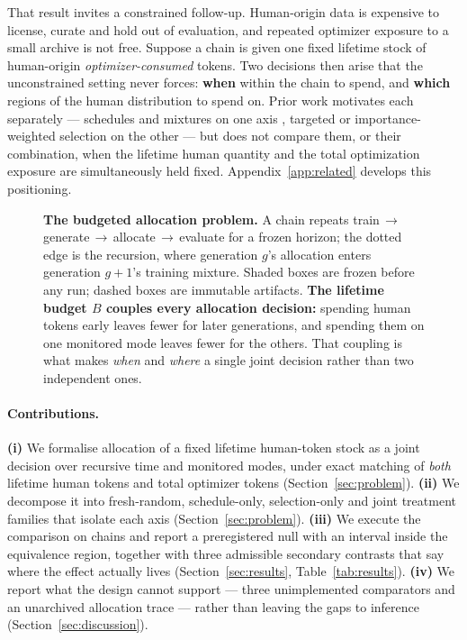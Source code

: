 \documentclass{article}
\begin{document}
That result invites a constrained follow-up. Human-origin data is expensive to license,
curate and hold out of evaluation, and repeated optimizer exposure to a small archive is
not free. Suppose a chain is given one fixed lifetime stock of human-origin
\emph{optimizer-consumed} tokens. Two decisions then arise that the unconstrained setting
never forces: \textbf{when} within the chain to spend, and \textbf{which} regions of the
human distribution to spend on. Prior work motivates each separately --- schedules and
mixtures on one axis \cite{xie2023doremi,liu2025regmix,zhao2026regmixd}, targeted or
importance-weighted selection on the other \cite{xie2023dsir,ash2020badge,liu2021jtt} ---
but does not compare them, or their combination, when the lifetime human quantity and the
total optimization exposure are simultaneously held fixed. Appendix~\ref{app:related}
develops this positioning.

\begin{figure}[t]
\centering

\caption{\textbf{The budgeted allocation problem.} A chain repeats
train\,$\rightarrow$\,generate\,$\rightarrow$\,allocate\,$\rightarrow$\,evaluate for a
frozen horizon; the dotted edge is the recursion, where generation $g$'s allocation enters
generation $g{+}1$'s training mixture. Shaded boxes are frozen before any run; dashed boxes
are immutable artifacts. \textbf{The lifetime budget $B$ couples every allocation
decision:} spending human tokens early leaves fewer for later generations, and spending
them on one monitored mode leaves fewer for the others. That coupling is what makes
\emph{when} and \emph{where} a single joint decision rather than two independent ones.}
\label{fig:pipeline}
\end{figure}

\paragraph{Contributions.}
\textbf{(i)} We formalise allocation of a fixed lifetime human-token stock as a joint
decision over recursive time and monitored modes, under exact matching of \emph{both}
lifetime human tokens and total optimizer tokens (Section~\ref{sec:problem}).
\textbf{(ii)} We decompose it into fresh-random, schedule-only, selection-only and joint
treatment families that isolate each axis (Section~\ref{sec:problem}).
\textbf{(iii)} We execute the comparison on \PilotChains{} chains and report a preregistered
null with an interval inside the equivalence region, together with three admissible
secondary contrasts that say where the effect actually lives (Section~\ref{sec:results},
Table~\ref{tab:results}).
\textbf{(iv)} We report what the design cannot support --- three unimplemented comparators
and an unarchived allocation trace --- rather than leaving the gaps to inference
(Section~\ref{sec:discussion}).
\end{document}
